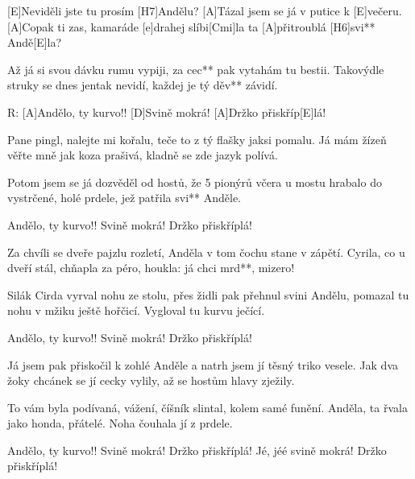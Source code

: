 
[E]Neviděli jste tu prosím [H7]Andělu?
[A]Tázal jsem se já v putice k [E]večeru.
[A]Copak ti zas, kamaráde [e]drahej slíbi[Cmi]la
ta [A]přitroublá [H6]svi** Andě[E]la?

Až já si svou dávku rumu vypiji,
za cec** pak vytahám tu bestii.
Takovýdle struky se dnes jentak nevidí,
každej je tý děv** závidí.

R:
[A]Andělo, ty kurvo!!
[D]Svině mokrá! [A]Držko přiskříp[E]lá!

Pane pingl, nalejte mi kořalu,
teče to z tý flašky jaksi pomalu.
Já mám žízeň věřte mně jak koza prašivá,
kladně se zde jazyk polívá.

Potom jsem se já dozvěděl od hostů,
že 5 pionýrů včera u mostu
hrabalo do vystrčené, holé prdele,
jež patřila svi** Anděle.

Andělo, ty kurvo!!
Svině mokrá! Držko přiskříplá!

Za chvíli se dveře pajzlu rozletí,
Anděla v tom čochu stane v zápětí.
Cyrila, co u dveří stál, chňapla za péro,
houkla: já chci mrd**, mizero!

Silák Cirda vyrval nohu ze stolu,
přes židli pak přehnul svini Andělu,
pomazal tu nohu v mžiku ještě hořčicí.
Vygloval tu kurvu ječící.

Andělo, ty kurvo!!
Svině mokrá! Držko přiskříplá!

Já jsem pak přiskočil k zohlé Anděle
a natrh jsem jí těsný triko vesele.
Jak dva žoky chcánek se jí cecky vylily,
až se hostům hlavy zježily.

To vám byla podívaná, vážení,
číšník slintal, kolem samé funění.
Anděla, ta řvala jako honda, přátelé.
Noha čouhala jí z prdele.

Andělo, ty kurvo!!
Svině mokrá! Držko přiskříplá!
Jé, jéé
svině mokrá! Držko přiskříplá!